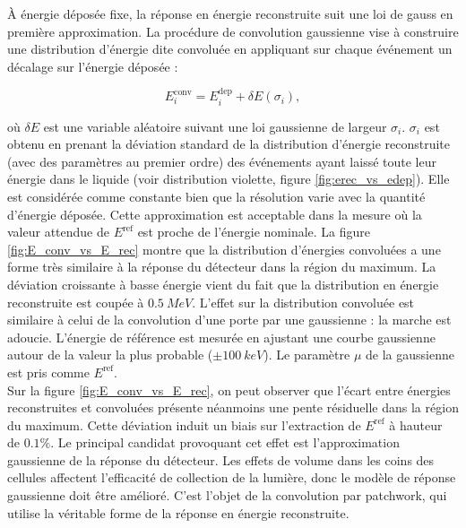 À énergie déposée fixe, la réponse en énergie reconstruite suit une loi de gauss en première approximation. La procédure de convolution gaussienne vise à construire une distribution d'énergie dite \og convoluée \fg{} en appliquant sur chaque événement un décalage sur l'énergie déposée :

\begin{equation}
    E^{\textrm{conv}}_{i} = E^{\textrm{dep}}_{i} + \delta E(\sigma_i),
\end{equation}

\bigbreak

où $\delta E$ est une variable aléatoire suivant une loi gaussienne de largeur $\sigma_i$. $\sigma_i$ est obtenu en prenant la déviation standard de la distribution d'énergie reconstruite (avec des paramètres au premier ordre) des événements ayant laissé toute leur énergie dans le liquide (voir distribution violette, figure \ref{fig:erec_vs_edep}). Elle est considérée comme constante bien que la résolution varie avec la quantité d'énergie déposée. Cette approximation est acceptable dans la mesure où la valeur attendue de $E^{\textrm{ref}}$ est proche de l'énergie nominale. La figure \ref{fig:E_conv_vs_E_rec} montre que la distribution d'énergies convoluées a une forme très similaire à la réponse du détecteur dans la région du maximum. La déviation croissante à basse énergie vient du fait que la distribution en énergie reconstruite est coupée à $\SI{0.5}{MeV}$. L'effet sur la distribution convoluée est similaire à celui de la convolution d'une porte par une gaussienne : la marche est adoucie. L'énergie de référence est mesurée en ajustant une courbe gaussienne autour de la valeur la plus probable ($\pm \SI{100}{keV}$). Le paramètre $\mu$ de la gaussienne est pris comme $E^{\textrm{ref}}$.\\

 Sur la figure \ref{fig:E_conv_vs_E_rec}, on peut observer que l'écart entre énergies reconstruites et convoluées présente néanmoins une pente résiduelle dans la région du maximum. Cette déviation induit un biais sur l'extraction de $E^{\textrm{ref}}$ à hauteur de $0.1\%$. Le principal candidat provoquant cet effet est l'approximation gaussienne de la réponse du détecteur. Les effets de volume dans les coins des cellules affectent l'efficacité de collection de la lumière, donc le modèle de réponse gaussienne doit être amélioré. C'est l'objet de la \og convolution par patchwork\fg{}, qui utilise la véritable forme de la réponse en énergie reconstruite.\\

